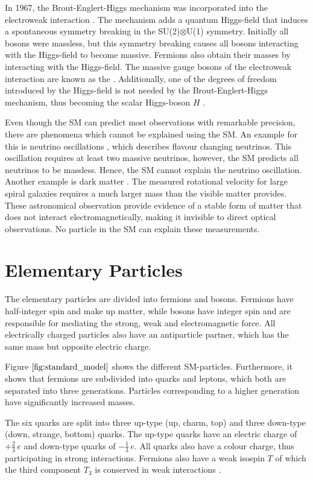 \documentclass[bachelor,oneside, BCOR10mm,
			ngerman,english  %
]{GAUBM}
\begin{document}
In 1967, the Brout-Englert-Higgs mechanism was incorporated into the electroweak interaction \cite{higgs_mechanism_1, higgs_mechanism_2, higgs_mechanism_3}. The mechanism adds a quantum Higgs-field that induces a spontaneous symmetry breaking in the SU(2)$\otimes$U(1) symmetry. Initially all bosons were massless, but this symmetry breaking causes all bosons interacting with the Higgs-field to become massive. Fermions also obtain their masses by interacting with the Higgs-field. The massive gauge bosons of the electroweak interaction are known as the \zwboson. Additionally, one of the degrees of freedom introduced by the Higgs-field is not needed by the Brout-Englert-Higgs mechanism, thus becoming the scalar Higgs-boson $H$ \cite{higgs_mechanism_1}.

Even though the SM can predict most observations with remarkable precision, there are phenomena which cannot be explained using the SM. An example for this is neutrino oscillations \cite{neutrino_oscillation}, which describes flavour changing neutrinos. This oscillation requires at least two massive neutrinos, however, the SM predicts all neutrinos to be massless. Hence, the SM cannot explain the neutrino oscillation. Another example is dark matter \cite{dark_matter}. The measured rotational velocity for large spiral galaxies requires a much larger mass than the visible matter provides. These astronomical observation provide evidence of a stable form of matter that does not interact electromagnetically, making it invisible to direct optical observations. No particle in the SM can explain these measurements.

\section{Elementary Particles}
The elementary particles are divided into fermions and bosons. Fermions have half-integer spin and make up matter, while bosons have integer spin and are responsible for mediating the strong, weak and electromagnetic force. All electrically charged particles also have an antiparticle partner, which has the same mass but opposite electric charge.

Figure $\ref{fig:standard_model}$ shows the different SM-particles. Furthermore, it shows that fermions are subdivided into quarks and leptons, which both are separated into three generations. Particles corresponding to a higher generation have significantly increased masses.

The six quarks are split into three up-type (up, charm, top) and three down-type (down, strange, bottom) quarks. The up-type quarks have an electric charge of $+\frac{2}{3}\,e$ and down-type quarks of $-\frac{1}{3}\,e$. All quarks also have a colour charge, thus participating in strong interactions. Fermions also have a weak isospin $T$ of which the third component $T_3$ is conserved in weak interactions \cite{qed03}.
\end{document}
